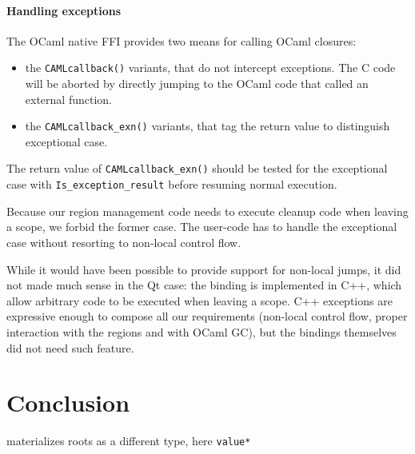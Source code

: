 \documentclass[a4paper]{easychair}
\begin{document}
\paragraph{Handling exceptions}

The OCaml native FFI provides two means for calling OCaml closures:

\begin{itemize}
\item the \texttt{CAMLcallback()} variants, that do not intercept
      exceptions. The C code will be aborted by directly jumping to the
      OCaml code that called an external function.
\item the \texttt{CAMLcallback\_exn()} variants, that tag the return value
      to distinguish exceptional case.
\end{itemize}

The return value of \texttt{CAMLcallback\_exn()} should be tested for
the exceptional case with \texttt{Is\_exception\_result} before resuming
normal execution.

Because our region management code needs to execute cleanup code when
leaving a scope, we forbid the former case. The user-code has to handle
the exceptional case without resorting to non-local control flow.

While it would have been possible to provide support for non-local
jumps, it did not made much sense in the Qt case: the binding is
implemented in C++, which allow arbitrary code to be executed when
leaving a scope. C++ exceptions are expressive enough to compose all our
requirements (non-local control flow, proper interaction with the
regions and with OCaml GC), but the bindings themselves did not need
such feature.

\section{Conclusion}

materializes roots as a different type, here \texttt{value*}

\label{sect:bib}

\end{document}
